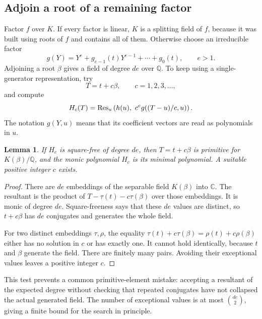 \documentclass[11pt]{article}
\newtheorem{lemma}[theorem]{Lemma}
\theoremstyle{definition}\newtheorem{definition}[theorem]{Definition}
\theoremstyle{remark}\newtheorem{remark}[theorem]{Remark}
\newcommand{\Q}{\mathbb Q}\newcommand{\C}{\mathbb C}\newcommand{\Z}{\mathbb Z}
\begin{document}
\subsection{Adjoin a root of a remaining factor}

Factor $f$ over $K$. If every factor is linear, $K$ is a splitting field of
$f$, because it was built using roots of $f$ and contains all of them. Otherwise
choose an irreducible factor
\begin{equation}
 g(Y)=Y^e+g_{e-1}(t)Y^{e-1}+\cdots+g_0(t),\qquad e>1.
\end{equation}
Adjoining a root $\beta$ gives a field of degree $de$ over $\Q$.
To keep using a single-generator representation, try
\begin{equation}
 T=t+c\beta,\qquad c=1,2,3,\ldots,
\end{equation}
and compute
\begin{equation}\label{eq:primitive-resultant}
 H_c(T)=\operatorname{Res}_u\left(h(u),\ c^e g((T-u)/c,u)\right).
\end{equation}
The notation $g(Y,u)$ means that its coefficient vectors are read as
polynomials in $u$.

\begin{lemma}\label{lem:primitive}
If $H_c$ is square-free of degree $de$, then $T=t+c\beta$ is primitive for
$K(\beta)/\Q$, and the monic polynomial $H_c$ is its minimal polynomial.
A suitable positive integer $c$ exists.
\end{lemma}
\begin{proof}
There are $de$ embeddings of the separable field $K(\beta)$ into $\C$.
The resultant is the product of $T-\tau(t)-c\tau(\beta)$ over those embeddings.
It is monic of degree $de$. Square-freeness says that these $de$ values are
distinct, so $t+c\beta$ has $de$ conjugates and generates the whole field.

For two distinct embeddings $\tau,\rho$, the equality
$\tau(t)+c\tau(\beta)=\rho(t)+c\rho(\beta)$ either has no solution in $c$ or
has exactly one. It cannot hold identically, because $t$ and $\beta$ generate
the field. There are finitely many pairs. Avoiding their exceptional values
leaves a positive integer $c$.
\end{proof}

This test prevents a common primitive-element mistake: accepting a resultant
of the expected degree without checking that repeated conjugates have not
collapsed the actual generated field. The number of exceptional values is at
most $\binom{de}{2}$, giving a finite bound for the search in principle.
\end{document}
